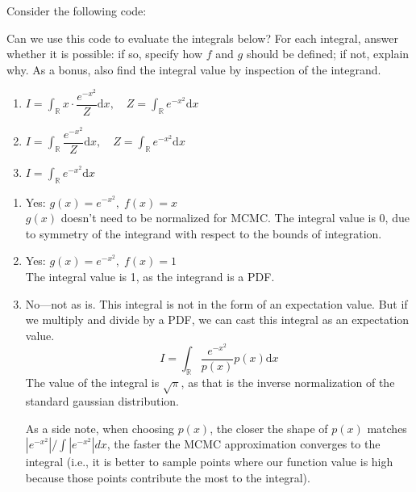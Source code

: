 \begin{exercise} %
    Consider the following code:

    

    Can we use this code to evaluate the integrals below? For each integral, answer whether it is possible: if so, specify how $f$ and $g$ should be defined; if not, explain why. As a bonus, also find the integral value by inspection of the integrand.

    \begin{enumerate}[label=(\alph*)]
        \item \(I = \int_{\mathbb{R}} x \cdot \dfrac{e^{-x^2}}{Z}\mathrm{d}x, \quad Z = \int_{\mathbb{R}} e^{-x^2}\mathrm{d}x\)\\[4pt]
        \item \(I = \int_{\mathbb{R}} \dfrac{e^{-x^2}}{Z}\mathrm{d}x, \quad Z = \int_{\mathbb{R}} e^{-x^2}\mathrm{d}x\)\\[4pt]
        \item \(I = \int_{\mathbb{R}} e^{-x^2}\mathrm{d}x\)
    \end{enumerate}
\end{exercise}

\begin{solution}
    \begin{enumerate}[label=(\alph*)]
        \item Yes: \(g(x) = e^{-x^2},\; f(x)=x\)\\
        \(g(x)\) doesn't need to be normalized for MCMC. The integral value is 0, due to symmetry of the integrand with respect to the bounds of integration.

        \item Yes: \(g(x) = e^{-x^2},\; f(x)=1\)\\
        The integral value is 1, as the integrand is a PDF.

        \item No---not as is. This integral is not in the form of an expectation value. But if we multiply and divide by a PDF, we can cast this integral as an expectation value.
        \[
            I = \int_\mathbb{R} \dfrac{e^{-x^2}}{p(x)} p(x)\mathrm{d}x
        \]
        The value of the integral is $\sqrt{\pi}$, as that is the inverse normalization of the standard gaussian distribution.

        As a side note, when choosing $p(x)$, the closer the shape of $p(x)$ matches $|e^{-x^2}|/\int|e^{-x^2}|dx$, the faster the MCMC approximation converges to the integral (i.e., it is better to sample points where our function value is high because those points contribute the most to the integral).
    \end{enumerate}
\end{solution}

